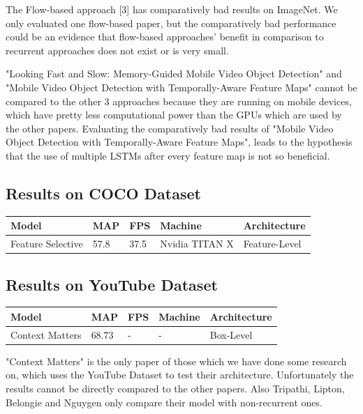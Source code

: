 \documentclass[conference]{IEEEtran}
\begin{document}
The Flow-based approach [3] has comparatively bad results on ImageNet. We only evaluated one flow-based paper, but the comparatively bad performance could be an evidence that flow-based approaches' benefit in comparison to recurrent approaches does not exist or is very small. \newline

"Looking Fast and Slow: Memory-Guided Mobile Video Object Detection" and "Mobile Video Object Detection with Temporally-Aware Feature Maps" cannot be compared to the other 3 approaches because they are running on mobile devices, which have pretty less computational power than the GPUs which are used by the other papers. Evaluating the comparatively bad results of "Mobile Video Object Detection with Temporally-Aware Feature Maps", leads to the hypothesis that the use of multiple LSTMs after every feature map is not so beneficial. 

\subsection{Results on COCO Dataset}

\begin{tabular}{ | p{2cm} | p{2em}| p{2em} | p{4em} | p{5em} | } 
 \hline
 Model & MAP & FPS & Machine & Architecture \\
 \hline
 Feature Selective \cite{b6} & 57.8 & 37.5 & Nvidia TITAN X & Feature-Level \\
 \hline
\end{tabular}

\subsection{Results on YouTube Dataset}

\begin{tabular}{ | p{2cm} | p{2em}| p{2em} | p{4em} | p{5em} | } 
 \hline
 Model & MAP & FPS & Machine & Architecture \\
 \hline
 Context Matters \cite{b4} & 68.73 & - & - & Box-Level \\
 \hline
\end{tabular} \newline

"Context Matters" is the only paper of those which we have done some research on, which uses the YouTube Dataset to test their architecture. Unfortunately the results cannot be directly compared to the other papers. Also Tripathi, Lipton, Belongie and Nguygen only compare their model with non-recurrent ones. \newline
\end{document}
